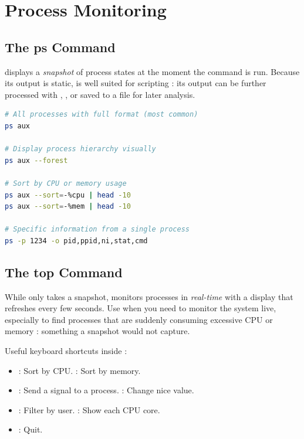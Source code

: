 \section{Process Monitoring}
\label{sec:process-monitoring}

\subsection{The ps Command}

 displays a \textit{snapshot} of process states at the moment the
command is run. Because its output is static,  is well suited for
scripting : its output can be further processed with , ,
or saved to a file for later analysis.

\begin{lstlisting}[language=bash, caption={Variations of ps usage}]
# All processes with full format (most common)
ps aux

# Display process hierarchy visually
ps aux --forest

# Sort by CPU or memory usage
ps aux --sort=-%cpu | head -10
ps aux --sort=-%mem | head -10

# Specific information from a single process
ps -p 1234 -o pid,ppid,ni,stat,cmd
\end{lstlisting}

\subsection{The top Command}

While  only takes a snapshot,  monitors processes in
\textit{real-time} with a display that refreshes every few seconds. Use
 when you need to monitor the system live, especially to find
processes that are suddenly consuming excessive CPU or memory : something a
 snapshot would not capture.

Useful keyboard shortcuts inside :

\begin{itemize}
  \item {}: Sort by CPU. \quad {}: Sort by memory.
  \item {}: Send a signal to a process. \quad {}: Change nice value.
  \item {}: Filter by user. \quad {}: Show each CPU core.
  \item {}: Quit.
\end{itemize}

